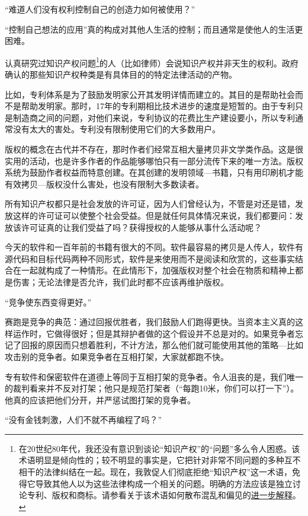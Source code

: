 \documentclass{book}
\begin{document}
“难道人们没有权利控制自己的创造力如何被使用？”\par
“控制自己想法的应用”真的构成对其他人生活的控制；而且通常是使他人的生活更困难。\par
认真研究过知识产权问题\footnote{在20世纪80年代，我还没有意识到谈论“知识产权”的“问题”多么令人困惑。该术语明显是倾向性的；较不明显的事实是，它把针对非常不同问题的多种互不相干的法律纠结在一起。现在，我敦促人们彻底拒绝“知识产权”这一术语，免得它导致其他人以为这些法律构成一个相关的问题。明确的方法应该是独立讨论专利、版权和商标。请参看关于该术语如何散布混乱和偏见的\href{http://www.gnu.org/philosophy/not-ipr.html}{进一步解释}。}的人（比如律师）会说知识产权并非天生的权利。政府确认的那些知识产权种类是有具体目的的特定法律活动的产物。\par
比如，专利体系是为了鼓励发明家公开其发明详情而建立的。其目的是帮助社会而不是帮助发明家。那时，17年的专利期相比技术进步的速度是短暂的。由于专利只是制造商之间的问题，对他们来说，专利协议的花费比生产建设要小，所以专利通常没有太大的害处。专利没有限制使用它们的大多数用户。\par
版权的概念在古代并不存在，那时作者们经常互相大量拷贝非文学类作品。这是很实用的活动，也是许多作者的作品能够哪怕只有一部分流传下来的唯一方法。版权系统为鼓励作者权益而特意创建。在其创建的发明领域—书籍，只有用印刷机才能有效拷贝—版权没什么害处，也没有限制大多数读者。\par
所有知识产权都只是社会发放的许可证，因为人们曾经认为，不管是对还是错，发放这样的许可证可以使整个社会受益。但是就任何具体情况来说，我们都要问：发放该许可证真的让我们受益了吗？获得授权的人能够从事什么活动呢？\par
今天的软件和一百年前的书籍有很大的不同。软件最容易的拷贝是人传人，软件有源代码和目标代码两种不同形式，软件是来使用而不是阅读和欣赏的，这些事实结合在一起就构成了一种情形。在此情形下，加强版权对整个社会在物质和精神上都是伤害；无论法律是否允许，我们此时都不应该再维护版权。\par
“竞争使东西变得更好。”\par
赛跑是竞争的典范：通过回报优胜者，我们鼓励人们跑得更快。当资本主义真的这样运作时，它做得很好；但是其辩护者做的这个假设并不总是对的。如果竞争者忘记了回报的原因而只想着胜利，不计方法，那么他们就可能使用其他的策略—比如攻击别的竞争者。如果竞争者在互相打架，大家就都跑不快。\par
专有软件和保密软件在道德上等同于互相打架的竞争者。令人沮丧的是，我们唯一的裁判看来并不反对打架；他只是规范打架者（“每跑10米，你们可以打一下”）。他真的应该把他们分开，并严惩试图打架的竞争者。\par
“没有金钱刺激，人们不就不再编程了吗？”\par
\end{document}
